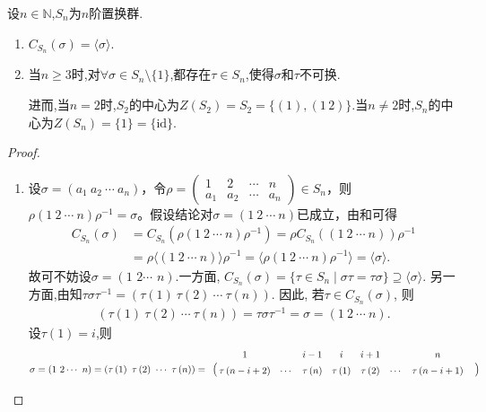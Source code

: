 \documentclass[../../main.tex]{subfiles}%
\begin{document}
\begin{proposition}\label{proposition:置换群的中心}
设$n\in \mathbb{N}$,$S_n$为$n$阶置换群.
\begin{enumerate}[(1)]
\item $C_{S_n}(\sigma)=\langle\sigma\rangle$.

\item 当$n\geqslant 3$时,对$\forall \sigma\in S_n\setminus\{1\}$,都存在$\tau\in S_n$,使得$\sigma$和$\tau$不可换.

进而,当$n=2$时,$S_2$的中心为$Z(S_2)=S_2=\{(1),(1\,2)\}$.当$n\neq 2$时,$S_n$的中心为$Z(S_n)=\{1\}=\{\text{id}\}$.
\end{enumerate}
\end{proposition}
\begin{proof}
\begin{enumerate}[(1)]
\item 设$\sigma=(a_1\ a_2\ \cdots\ a_n)$，令$\rho=\begin{pmatrix}1&2&\cdots&n\\a_1&a_2&\cdots&a_n\end{pmatrix}\in S_n$，则$\rho(1\ 2\ \cdots\ n)\rho^{-1}=\sigma$。假设结论对$\sigma=(1\ 2\ \cdots\ n)$已成立，由和可得
\begin{align*}
C_{S_n}(\sigma)&=C_{S_n}\left(\rho(1\ 2\ \cdots\ n)\rho^{-1}\right)
=\rho C_{S_n}\left((1\ 2\ \cdots\ n)\right)\rho^{-1}\\
&=\rho\langle(1\ 2\ \cdots\ n)\rangle\rho^{-1}
=\langle\rho(1\ 2\ \cdots\ n)\rho^{-1}\rangle
=\langle\sigma\rangle.
\end{align*}
故可不妨设$\sigma = \left( 1\,\, 2 \cdots \,\,n \right)$.一方面,
$C_{S_n}(\sigma)=\{\tau\in S_n\mid \sigma\tau=\tau\sigma\}\supseteq\langle\sigma\rangle$. 另一方面,由知$\tau\sigma\tau^{-1}=(\tau(1)\ \tau(2)\ \cdots\ \tau(n))$. 因此, 若$\tau\in C_{S_n}(\sigma)$, 则
\begin{align*}
(\tau(1)\ \tau(2)\ \cdots\ \tau(n))=\tau\sigma\tau^{-1}=\sigma=(1\ 2\ \cdots\ n). 
\end{align*}
设$\tau(1)=i$,则
\begin{align*}
\sigma = \left( 1\,\, 2 \cdots \,\,n \right) = \left( \tau \left( 1 \right) \,\,\tau \left( 2 \right) \,\,\cdots \,\,\tau \left( n \right) \right) = 
\bordermatrix{%
& 1 &  & i-1 & i & i+1 &  & n & \cr
& \tau \left( n-i+2 \right) & \cdots & \tau \left( n \right) & \tau \left( 1 \right) & \tau \left( 2 \right) & \cdots & \tau \left( n-i+1 \right) & \cr
}
\end{align*}
\end{enumerate}
\end{proof}
\end{document}
